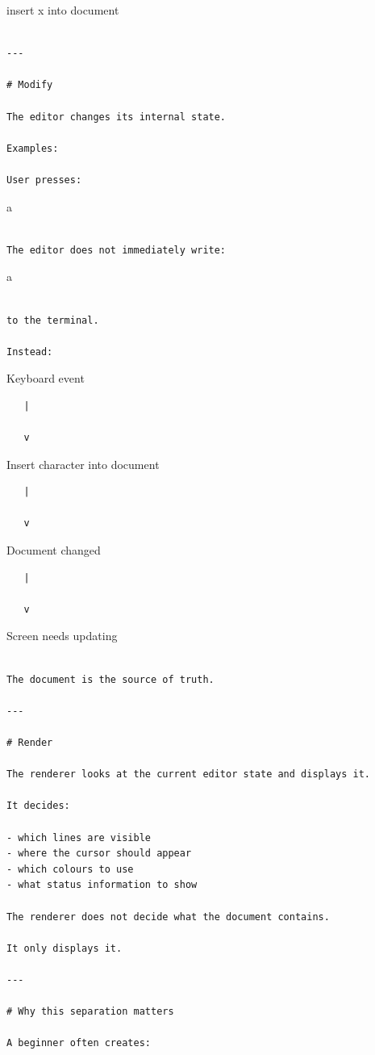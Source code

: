 \documentclass[
  oneside,
  openany]{book}
\begin{document}
insert x into document

\begin{verbatim}

---

# Modify

The editor changes its internal state.

Examples:

User presses:
\end{verbatim}

a

\begin{verbatim}

The editor does not immediately write:
\end{verbatim}

a

\begin{verbatim}

to the terminal.

Instead:
\end{verbatim}

Keyboard event

\begin{verbatim}
   |

   v
\end{verbatim}

Insert character into document

\begin{verbatim}
   |

   v
\end{verbatim}

Document changed

\begin{verbatim}
   |

   v
\end{verbatim}

Screen needs updating

\begin{verbatim}

The document is the source of truth.

---

# Render

The renderer looks at the current editor state and displays it.

It decides:

- which lines are visible
- where the cursor should appear
- which colours to use
- what status information to show

The renderer does not decide what the document contains.

It only displays it.

---

# Why this separation matters

A beginner often creates:
\end{verbatim}
\end{document}
